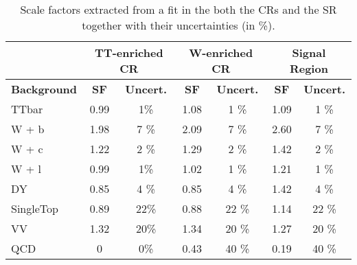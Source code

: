 \documentclass[10pt]{article}
\begin{document}
\begin{table}[!ht]
\begin{center}
\begin{tabular}{|l|c|c||c|c||c|c|}
\hline
\hline
& \multicolumn{2}{c|}{\textbf{TT-enriched CR }} & \multicolumn{2}{c|}{\textbf{W-enriched CR}}  & \multicolumn{2}{c|}{\textbf{Signal Region}} \\
\hline
\hline
\textbf{Background} & \textbf{SF} & \textbf{Uncert.} & \textbf{SF} & \textbf{Uncert.} & \textbf{SF} & \textbf{Uncert.}\\
\hline
TTbar                       & 0.99 & 1\%    & 1.08 & 1  \%  & 1.09 & 1  \% \\
\hline                                                                     
W + b                       & 1.98 & 7 \%   & 2.09 & 7  \%  & 2.60 & 7  \% \\
W + c                       & 1.22 & 2 \%   & 1.29 & 2  \%  & 1.42 & 2  \% \\
W + l                       & 0.99 & 1\%    & 1.02 & 1  \%  & 1.21 & 1  \% \\
\hline                                                                     
DY                          & 0.85 & 4 \%   & 0.85 & 4  \%  & 1.42 & 4  \% \\
\hline                                                                     
SingleTop                   & 0.89 & 22\%   & 0.88 & 22 \%  & 1.14 & 22 \% \\
\hline                                                                     
VV                          & 1.32 & 20\%   & 1.34 & 20 \%  & 1.27 & 20 \% \\
\hline                                                                     
QCD                         & 0    & 0\%    & 0.43 & 40 \%  & 0.19 & 40 \% \\
\hline
\hline
\end{tabular}
\caption{Scale factors extracted from a fit in the both the CRs and the SR together with their uncertainties (in \%).}
\label{tab:SFtable}
\end{center}
\end{table} 
\end{document}
